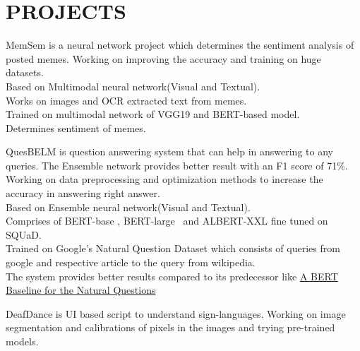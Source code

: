 \documentclass[a4paper]{deedy-resume-openfont}
\begin{document}
\begin{minipage}[t]{0.66\textwidth} 



\section{PROJECTS}

MemSem is a neural network project which determines the sentiment analysis
of posted memes. Working on improving the accuracy and training on huge
datasets. \\

\textbullet{} Based on Multimodal neural network(Visual and Textual). \\
\textbullet{} Works on images and OCR extracted text from memes. \\
\textbullet{} Trained on multimodal network of VGG19 and BERT-based model. \\
\textbullet{} Determines sentiment of memes. \\
\sectionsep

QuesBELM is question answering system that can help in answering to any queries. The Ensemble network provides better result with an F1 score of 71\%. Working on data preprocessing and optimization methods to increase the accuracy in answering right answer. \\

\textbullet{} Based on Ensemble neural network(Visual and Textual). \\
\textbullet{} Comprises of BERT-base , BERT-large \ and ALBERT-XXL fine tuned on SQUaD. \\
\textbullet{} Trained on Google's Natural Question Dataset which consists of queries from google and respective article to the query from wikipedia. \\
\textbullet{} The system provides better results compared to its predecessor like \href{https://arxiv.org/pdf/1901.08634.pdf}{{A BERT Baseline for the Natural Questions}}
\sectionsep

DeafDance is UI based script to understand sign-languages. Working on image
segmentation and calibrations of pixels in the images and trying pre-trained
models. \\


\end{minipage}
\end{document}
